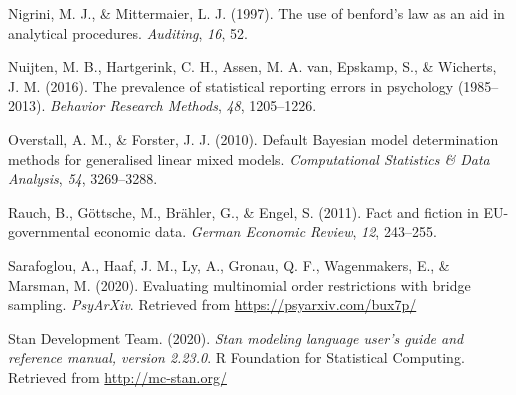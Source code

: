 \documentclass[
  english,
  man,floatsintext]{apa6}
\newlength{\cslhangindent}
\newenvironment{cslreferences}%
  {\setlength{\parindent}{0pt}%
  \everypar{\setlength{\hangindent}{\cslhangindent}}\ignorespaces}%
  {\par}
\begin{document}
\begin{cslreferences}
\leavevmode\hypertarget{ref-nigrini1997use}{}%
Nigrini, M. J., \& Mittermaier, L. J. (1997). The use of benford's law as an aid in analytical procedures. \emph{Auditing}, \emph{16}, 52.

\leavevmode\hypertarget{ref-nuijten2016prevalence}{}%
Nuijten, M. B., Hartgerink, C. H., Assen, M. A. van, Epskamp, S., \& Wicherts, J. M. (2016). The prevalence of statistical reporting errors in psychology (1985--2013). \emph{Behavior Research Methods}, \emph{48}, 1205--1226.

\leavevmode\hypertarget{ref-overstall2010default}{}%
Overstall, A. M., \& Forster, J. J. (2010). Default Bayesian model determination methods for generalised linear mixed models. \emph{Computational Statistics \& Data Analysis}, \emph{54}, 3269--3288.

\leavevmode\hypertarget{ref-rauch2011fact}{}%
Rauch, B., Göttsche, M., Brähler, G., \& Engel, S. (2011). Fact and fiction in EU-governmental economic data. \emph{German Economic Review}, \emph{12}, 243--255.

\leavevmode\hypertarget{ref-sarafoglou2020evaluatingPreprint}{}%
Sarafoglou, A., Haaf, J. M., Ly, A., Gronau, Q. F., Wagenmakers, E., \& Marsman, M. (2020). Evaluating multinomial order restrictions with bridge sampling. \emph{PsyArXiv}. Retrieved from \url{https://psyarxiv.com/bux7p/}

\leavevmode\hypertarget{ref-stan2020}{}%
Stan Development Team. (2020). \emph{Stan modeling language user's guide and reference manual, version 2.23.0}. R Foundation for Statistical Computing. Retrieved from \url{http://mc-stan.org/}
\end{cslreferences}

\endgroup


\clearpage
\makeatletter
\efloat@restorefloats
\makeatother
\end{document}
